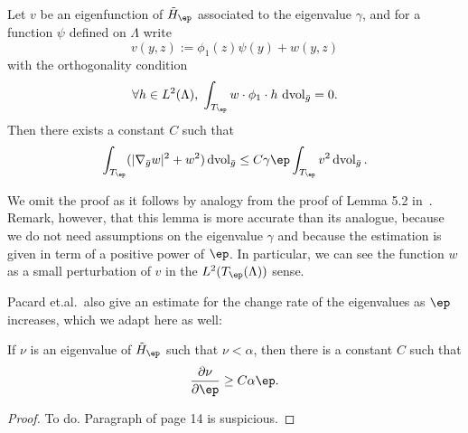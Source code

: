 \begin{lemma}
    Let $v$ be an eigenfunction of $\tilde H_\ep$ associated to the eigenvalue
    $\gamma$, and for a function $\psi$ defined on $\Lambda$ write
    \begin{equation}
        v(y,z):=\phi_1(z)\psi(y)+w(y,z)
    \end{equation}
    with the orthogonality condition
    \begin{equation}
        \forall h \in L^2(\Lambda),\; \int_{T_\ep}w\cdot \phi_1\cdot h\, \operatorname{dvol}_{\bar g} = 0.
    \end{equation}
    Then there exists a constant $C$ such that
    \begin{equation}
        \int_{T_\ep}(|\nabla_{\bar g}w|^2+w^2)\operatorname{dvol}_{\bar g} \leq
        C\gamma\ep\int_{T_\ep} v^2\operatorname{dvol}_{\bar g}.
    \end{equation}
\end{lemma}
We omit the proof as it follows by analogy from the proof of Lemma 5.2
in~\cite{Pacard2014}. Remark, however, that this lemma is more accurate than
its
analogue, because we do not need assumptions on the eigenvalue $\gamma$ and
because the estimation is given in term of a positive power of $\ep$. In
particular, we can see the function $w$ as a small perturbation of $v$ in the
$L^2(T_\ep(\Lambda))$ sense.
\medskip

Pacard et.al.\ also give an estimate for the change rate of the eigenvalues as
$\ep$ increases, which we adapt here as well:

\begin{lemma}\label{lem-partial-nu}
    If $\nu$ is an eigenvalue of $\tilde H_\ep$ such that $\nu<\alpha$, then
    there is a constant $C$ such that
    \[
        \frac{\partial \nu}{\partial \ep} \geq C\alpha\ep.
    \]
\end{lemma}
\begin{proof}
    {\color{red} To do. Paragraph of page 14 is suspicious.}
\end{proof}
